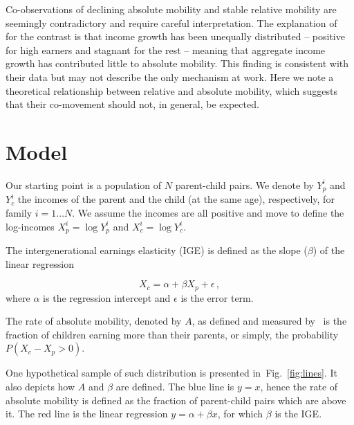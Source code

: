 \documentclass[final,10pt,5p,twocolumn,authoryear]{elsarticle}
\newcommand{\fref}[1]{Fig.~\ref{fig:#1}}
\newcommand{\be}{\begin{equation}}
\newcommand{\ee}{\end{equation}}
\numberwithin{equation}{section}
\begin{document}
Co-observations of declining absolute mobility and stable relative mobility are seemingly contradictory and require careful interpretation. The explanation of~\citet{chetty2017fading} for the contrast is that income growth has been unequally distributed -- positive for high earners and stagnant for the rest -- meaning that aggregate income growth has contributed little to absolute mobility. This finding is consistent with their data but may not describe the only mechanism at work. Here we note a theoretical relationship between relative and absolute mobility, which suggests that their co-movement should not, in general, be expected.

\section{Model}

Our starting point is a population of $N$ parent-child pairs. We denote by $Y_p^i$ and $Y_c^i$ the incomes of the parent and the child (at the same age), respectively, for family $i=1\dots N$. We assume the incomes are all positive and move to define the log-incomes $X_p^i=\log Y_p^i$ and $X_c^i=\log Y_c^i$.

The intergenerational earnings elasticity (IGE) is defined as the slope ($\beta$) of the linear regression

\be
X_c = \alpha + \beta X_p + \epsilon\,,
\ee
where $\alpha$ is the regression intercept and $\epsilon$ is the error term.

The rate of absolute mobility, denoted by $A$, as defined and measured by~\citet{chetty2017fading} is the fraction of children earning more than their parents, or simply, the probability $P\left(X_c-X_p > 0\right)$.

One hypothetical sample of such distribution is presented in~\fref{lines}. It also depicts how $A$ and $\beta$ are defined. The blue line is $y=x$, hence the rate of absolute mobility is defined as the fraction of parent-child pairs which are above it. The red line is the linear regression $y=\alpha +\beta x$, for which $\beta$ is the IGE.
\end{document}
